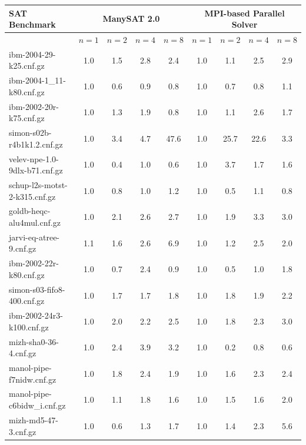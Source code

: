 \documentclass[letterpaper, compsoc, conference]{IEEEtran}
\begin{document}
\begin{table}[htbp]
    \begin{center}
    \begin{tabular}{|l|c|c|c|c|c|c|c|c|}
        \hline
        {\textbf{SAT Benchmark}} & \multicolumn{4}{c|}{\bf ManySAT 2.0} & \multicolumn{4}{c|}{\bf MPI-based Parallel Solver} \\
        \hline
        & $n=1$ & $n=2$ & $n=4$ & $n=8$ & $n=1$ & $n=2$ & $n=4$ & $n=8$ \\
        \hline
        ibm-2004-29-k25.cnf.gz             &       1.0 &  1.5 &  2.8 &  2.4 &  1.0 &  1.1 &  2.5 &  2.9 \\
        ibm-2004-1\_11-k80.cnf.gz          &       1.0 &  0.6 &  0.9 &  0.8 &  1.0 &  0.7 &  0.8 &  1.1 \\
        ibm-2002-20r-k75.cnf.gz            &       1.0 &  1.3 &  1.9 &  0.8 &  1.0 &  1.1 &  2.6 &  1.7 \\
        simon-s02b-r4b1k1.2.cnf.gz         &       1.0 &  3.4 &  4.7 & 47.6 &  1.0 & 25.7 & 22.6 &  3.3 \\
        velev-npe-1.0-9dlx-b71.cnf.gz      &       1.0 &  0.4 &  1.0 &  0.6 &  1.0 &  3.7 &  1.7 &  1.6 \\
        schup-l2s-motst-2-k315.cnf.gz      &       1.0 &  0.8 &  1.0 &  1.2 &  1.0 &  0.5 &  1.1 &  0.8 \\
        goldb-heqc-alu4mul.cnf.gz          &       1.0 &  2.1 &  2.6 &  2.7 &  1.0 &  1.9 &  3.3 &  3.0 \\
        jarvi-eq-atree-9.cnf.gz            &       1.1 &  1.6 &  2.6 &  6.9 &  1.0 &  1.2 &  2.5 &  2.0 \\
        ibm-2002-22r-k80.cnf.gz            &       1.0 &  0.7 &  2.4 &  0.9 &  1.0 &  0.5 &  1.0 &  1.8 \\
        simon-s03-fifo8-400.cnf.gz         &       1.0 &  1.7 &  1.7 &  1.8 &  1.0 &  1.8 &  1.9 &  2.2 \\
        ibm-2002-24r3-k100.cnf.gz          &       1.0 &  2.0 &  2.2 &  2.5 &  1.0 &  1.8 &  2.3 &  3.0 \\
        mizh-sha0-36-4.cnf.gz              &       1.0 &  2.4 &  3.9 &  3.2 &  1.0 &  0.2 &  0.8 &  0.6 \\
        manol-pipe-f7nidw.cnf.gz           &       1.0 &  1.8 &  2.4 &  1.9 &  1.0 &  1.6 &  2.3 &  2.4 \\
        manol-pipe-c6bidw\_i.cnf.gz        &       1.0 &  1.1 &  1.8 &  1.6 &  1.0 &  1.5 &  1.6 &  2.0 \\
        mizh-md5-47-3.cnf.gz               &       1.0 &  0.6 &  1.3 &  1.7 &  1.0 &  1.4 &  2.3 &  5.6 \\

\end{tabular}
\end{center}
\end{table}
\end{document}
